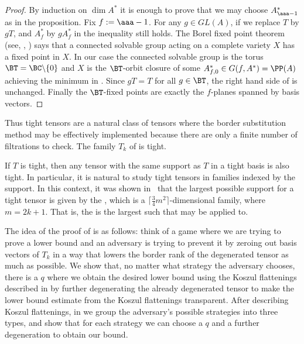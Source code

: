 \documentclass{toc}
\begin{document}
\begin{proof} 
By induction on $\dim A^*$ it is enough to prove that we may choose $A_{\aaa-1}^*$ as in the proposition.
Fix $f:=\aaa-1$. For any $g\in GL(A)$,
if we replace $T$ by $gT$, and $A_f^*$ by $gA_f^*$  in  
the inequality still holds.
The Borel fixed point theorem (see, \eg, \cite[\S 21.2]{MR0396773}) says that a connected
solvable group acting on a complete variety $X$ has a fixed point in $X$. In our case the 
connected solvable
group is the torus $\BT=\BC\backslash\{0\}$ and $X$ is the $\BT$-orbit closure
of some $A^*_{f,0}\in G(f,A^*)=\PP(A)$ achieving the minimum in .
Since $gT=T$ for all $g\in \BT$, the right hand side of  is
unchanged. Finally  the $\BT$-fixed points are exactly the $f$-planes spanned
by basis vectors.  
\end{proof}

Thus tight tensors are a natural class of tensors where the border substitution method may
be
effectively implemented because there are only a finite number of filtrations to check.
The family $T_k$ of %
 is tight.

If $T$ is tight, then any tensor with the same support as $T$ in a tight basis is also tight. In particular, it
is natural to study tight tensors in families indexed by the support. In this context, 
it was shown in~\cite{MR4204580} that the largest possible  support  
for a tight tensor is given by the   ,  
which  is a $\lceil \frac 34 m^2\rceil$-dimensional
family, where $m=2k+1$. That is, the 
is the largest such
that  may be applied to.

The idea of the proof of  is as follows: think of a game where we are trying to
prove a lower bound and an adversary is trying to prevent it by zeroing out basis vectors
of $T_k$ in a way that lowers the border rank  of the degenerated tensor as much as possible. We show that, no matter
what strategy the adversary chooses, there is a $q$ where we obtain the desired lower bound
using the Koszul flattenings described in
%
by further degenerating the already degenerated
tensor to make the lower bound estimate from the Koszul flattenings transparent.  
After describing   Koszul
flattenings, in %
we group the adversary's possible strategies into three types, and show
that  for each
strategy we can choose a $q$ and a further degeneration to obtain our bound.
\end{document}
